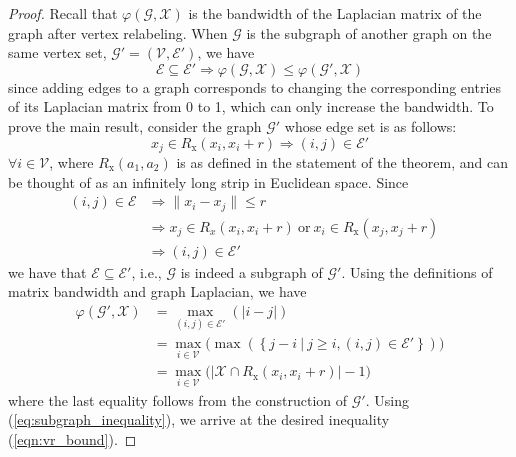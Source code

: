 \documentclass[twocolumn]{article}
\theoremstyle{plain}
\theoremstyle{definition}
\theoremstyle{definition}
\theoremstyle{remark}
\begin{document}
\begin{proof}
Recall that $\varphi(\mathcal G, \mathcal X)$ is the bandwidth of the Laplacian matrix of the graph after vertex relabeling. When $\mathcal G$ is the subgraph of another graph on the same vertex set, $\mathcal{G}' = (\mathcal{V}, \mathcal{E}')$, we have
\begin{equation}
    \mathcal{E} \subseteq \mathcal{E}' \Rightarrow \varphi(\mathcal G, \mathcal X) \leq \varphi(\mathcal G', \mathcal X)
    \label{eq:subgraph_inequality}
\end{equation}
since adding edges to a graph corresponds to changing the corresponding entries of its Laplacian matrix from 0 to 1, which can only increase the bandwidth.
To prove the main result, consider the graph $\mathcal{G}'$ whose edge set is as follows:
\begin{equation}
    x_j \in \textit{R}_\textrm{x}(x_i, x_i+r) \Rightarrow (i,j) \in \mathcal E'
\end{equation}
$\forall i \in \mathcal V$, where $\textit{R}_\textrm{x}(a_1,a_2)$ is as defined in the statement of the theorem, and can be thought of as an infinitely long strip in Euclidean space. Since
\begin{align}
(i,j) \in \mathcal E  & \Rightarrow  \|x_i - x_j\| \leq r \nonumber \\ & \Rightarrow   x_j \in \textit{R}_\textit{x}(x_i, x_i+r)\ \textrm{or}\  x_i \in \textit{R}_\textrm{x}(x_j, x_j+r) & \nonumber \\
&\Rightarrow (i,j) \in \mathcal E'
\end{align}
we have that $\mathcal{E}\subseteq \mathcal{E}'$, i.e., $\mathcal{G}$ is indeed a subgraph of $\mathcal{G}'$.
Using the definitions of matrix bandwidth and graph Laplacian, we have
\begin{align}
\varphi(\mathcal G', \mathcal X) &= \max_{(i,j)\in \mathcal E'} \left( |i - j|  \right)\\
&= \max_{i \in \mathcal V}\Big(\max \left(
\left\lbrace j - i \ \big|\ j\geq i, (i,j)\in \mathcal E' \right\rbrace
\right)
\Big)
\\
&= \max_{i\in \mathcal V}\Big
( | \mathcal{X}\cap \textit{R}_\textrm{x}(x_i, x_i+r) | - 1 \Big) 
\end{align}
where the last equality follows from the construction of $\mathcal G'$. Using (\ref{eq:subgraph_inequality}), we arrive at the desired inequality (\ref{eqn:vr_bound}).
\end{proof}
\end{document}
